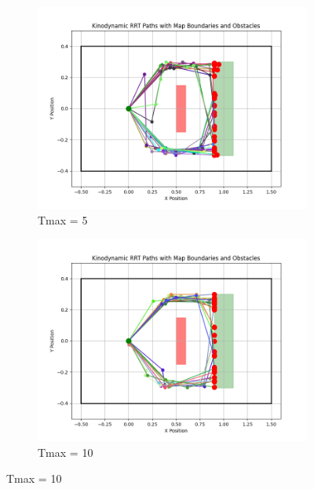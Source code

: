 \documentclass[12pt]{article}
\begin{document}
\begin{figure}[h!]
    \centering
    \begin{subfigure}{0.45\textwidth}
        \centering
        \includegraphics[width=\textwidth]{./images/5.png}
        \caption{Tmax = 5}
        \label{fig:5.png}
    \end{subfigure}
    \hfill
    \begin{subfigure}{0.45\textwidth}
        \centering
        \includegraphics[width=\textwidth]{./images/10.png}
        \caption{Tmax = 10}
        \label{fig:10.png}
    \end{subfigure}
    
    \vspace{0.5cm} %


\end{figure}
\end{document}
